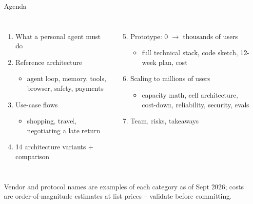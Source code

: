 \documentclass[aspectratio=169,10pt]{beamer}
\begin{document}
\begin{frame}{Agenda}
\begin{columns}[T]
\begin{enumerate}
  \item What a personal agent must do
  \item Reference architecture
    \begin{itemize}\item agent loop, memory, tools, browser, safety, payments\end{itemize}
  \item Use-case flows
    \begin{itemize}\item shopping, travel, negotiating a late return\end{itemize}
  \item 14 architecture variants + comparison
\end{enumerate}
\begin{enumerate}\setcounter{enumi}{4}
  \item Prototype: 0 $\rightarrow$ thousands of users
    \begin{itemize}\item full technical stack, code sketch, 12-week plan, cost\end{itemize}
  \item Scaling to millions of users
    \begin{itemize}\item capacity math, cell architecture, cost-down, reliability, security, evals\end{itemize}
  \item Team, risks, takeaways
\end{enumerate}
\end{columns}
\vfill
{\scriptsize\color{slate} Vendor and protocol names are examples of each category as of Sept 2026; costs are order-of-magnitude
estimates at list prices -- validate before committing.}
\end{frame}

\end{document}
